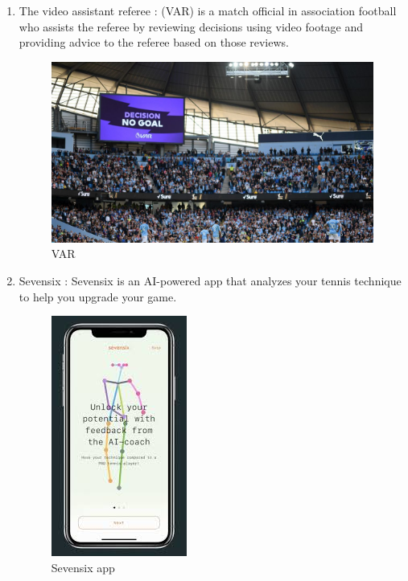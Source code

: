 \documentclass[12pt]{article}
\begin{document}
\begin{enumerate}
    \item The video assistant referee \cite{var}: (VAR) is a match official in association football who assists the referee by reviewing decisions using video footage and providing advice to the referee based on those reviews.
        \begin{figure}[hbt!]
            \centering
            \includegraphics[width=0.6\linewidth]{figures/var-decision.jpg}
            \caption{VAR}
            \label{fig:enter-label}
        \end{figure}
    \item Sevensix \cite{sevensix}: Sevensix is an AI-powered app that analyzes your tennis technique to help you upgrade your game.
        \begin{figure}[hbt!]
            \centering
            \includegraphics{figures/sevensix app.jpeg}
            \caption{Sevensix app}
            \label{fig:sevensix app}
        \end{figure}



\end{enumerate}

\newpage
\end{document}
